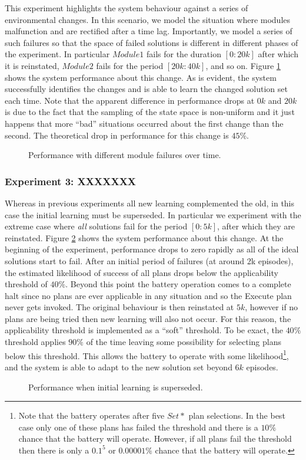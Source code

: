 This experiment highlights the system behaviour against a series of environmental changes. In this scenario, we model the situation where modules malfunction and are rectified after a time lag. Importantly, we model a series of such failures so that the space of failed solutions is different in different phases of the experiment. In particular $Module1$ fails for the duration $[0:20k]$ after which it is reinstated, $Module2$ fails for the period $[20k:40k]$, and so on. Figure \ref{fig:experiment2} shows the system performance about this change. As is evident, the system successfully identifies the changes and is able to learn the changed solution set each time. Note that the apparent difference in performance drops at $0k$ and $20k$ is due to the fact that the sampling of the state space is non-uniform and it just happens that more ``bad'' situations occurred about the first change than the second. The theoretical drop in performance for this change is $45\%$. 

\begin{figure}[t]
\begin{center}

\end{center}
\caption{Performance with different module failures over time.}
\label{fig:experiment2}
\end{figure}

\subsubsection{Experiment 3: XXXXXXX}

Whereas in previous experiments all new learning complemented the old, in this case the initial learning must be superseded. In particular we experiment with the extreme case where {\em all} solutions fail for the period $[0:5k]$, after which they are reinstated. Figure \ref{fig:experiment3} shows the system performance about this change. At the beginning of the experiment, performance drops to zero rapidly as all of the ideal solutions start to fail. After an initial period of failures (at around 2k episodes), the estimated likelihood of success of all plans drops below the applicability threshold of $40\%$. Beyond this point the battery operation comes to a complete halt since no plans are ever applicable in any situation and so the Execute plan never gets invoked. The original behaviour is then reinstated at $5k$, however if no plans are being tried then new learning will also not occur. For this reason, the applicability threshold is implemented as a ``soft'' threshold. To be exact, the $40\%$ threshold applies $90\%$ of the time leaving some possibility for selecting plans below this threshold. This allows the battery to operate with some likelihood\footnote{Note that the battery operates after five $Set*$ plan selections. In the best case only one of these plans has failed the threshold and there is a $10\%$ chance that the battery will operate. However, if all plans fail the threshold then there is only a $0.1^5$ or $0.00001\%$ chance that the battery will operate.}, and the system is able to adapt to the new solution set beyond $6k$ episodes.


\begin{figure}[t]
\begin{center}

\end{center}
\caption{Performance when initial learning is superseded.}
\label{fig:experiment3}
\end{figure}
